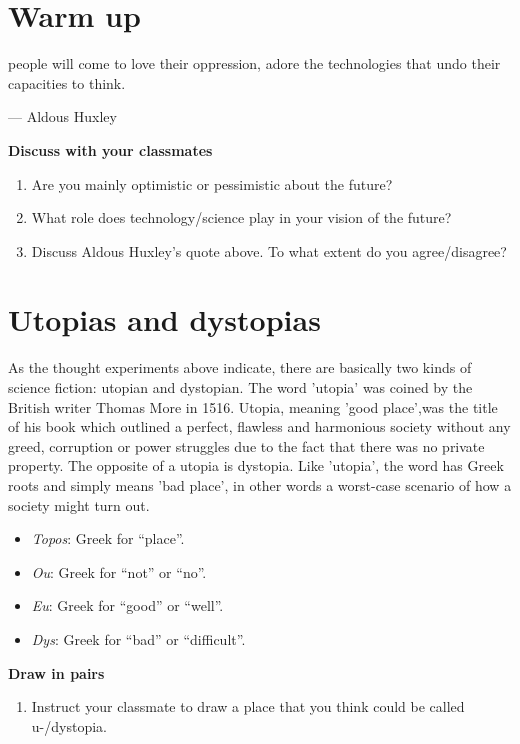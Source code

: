 \documentclass[11pt,a4paper,oneside]{book}
\newcommand{\tasktitle}[1]{{\color{blue}\bfseries #1}\par\smallskip}
\begin{document}
\section*{Warm up}
\begin{quotebox}
people will come to love their oppression, adore the technologies that undo their capacities to think.

— Aldous Huxley

\end{quotebox}
\begin{taskbox}
\tasktitle{Discuss with your classmates}
\begin{enumerate}
\item Are you mainly optimistic or pessimistic about the future?
\item What role does technology/science play in your vision of the future?
\item Discuss Aldous Huxley’s quote above. To what extent do you agree/disagree?
\end{enumerate}
\end{taskbox}

\section*{Utopias and dystopias}
As the thought experiments above indicate, there are basically two kinds of science fiction: utopian and dystopian. The word 'utopia' was coined by the British writer Thomas More in 1516. Utopia, meaning 'good place',was the title of his book which outlined a perfect, flawless and harmonious society without any greed, corruption or power struggles due to the fact that there was no private property. The opposite of a utopia is dystopia. Like 'utopia', the word has Greek roots and simply means 'bad place', in other words a worst-case scenario of how a society might turn out.


\begin{itemize}
\item \emph{Topos}: Greek for “place”.
\item \emph{Ou}: Greek for “not” or “no”.
\item \emph{Eu}: Greek for “good” or “well”.
\item \emph{Dys}: Greek for “bad” or “difficult”.
\end{itemize}
\begin{taskbox}
\tasktitle{Draw in pairs}
\begin{enumerate}
\item Instruct your classmate to draw a place that you think could be called u-/dystopia.
\end{enumerate}
\end{taskbox}
\end{document}
